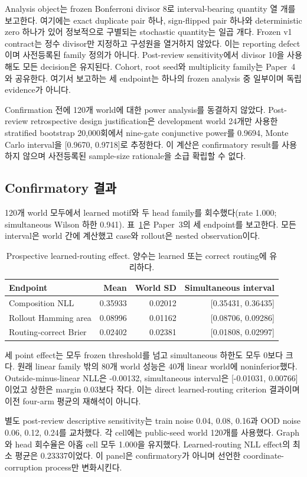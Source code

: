 Analysis object는 frozen Bonferroni divisor 8로 interval-bearing quantity 열 개를
보고한다. 여기에는 exact duplicate pair 하나, sign-flipped pair 하나와 deterministic
zero 하나가 있어 정보적으로 구별되는 stochastic quantity는 일곱 개다. Frozen v1
contract는 정수 divisor만 지정하고 구성원을 열거하지 않았다. 이는 reporting
defect이며 사전등록된 family 정의가 아니다. Post-review sensitivity에서 divisor 10을
사용해도 모든 decision은 유지된다. Cohort, root seed와 multiplicity family는
Paper~4와 공유한다. 여기서 보고하는 세 endpoint는 하나의 frozen analysis 중 일부이며
독립 evidence가 아니다.

Confirmation 전에 120개 world에 대한 power analysis를 동결하지 않았다. Post-review
retrospective design justification은 development world 24개만 사용한 stratified
bootstrap 20,000회에서 nine-gate conjunctive power를 0.9694, Monte Carlo interval을
[0.9670, 0.9718]로 추정한다. 이 계산은 confirmatory result를 사용하지 않으며
사전등록된 sample-size rationale을 소급 확립할 수 없다.

\subsection{Confirmatory 결과}

120개 world 모두에서 learned motif와 두 head family를 회수했다(rate 1.000;
simultaneous Wilson 하한 0.941). 표~\ref{tab:resolution}은 Paper~3의 세 endpoint를
보고한다. 모든 interval은 world 간에 계산했고 case와 rollout은 nested
observation이다.

\begin{table}[ht]
\centering
\caption{Prospective learned-routing effect. 양수는 learned 또는 correct routing에
유리하다.}
\label{tab:resolution}
\begin{tabular}{lrrr}
\toprule
Endpoint & Mean & World SD & Simultaneous interval \\
\midrule
Composition NLL & 0.35933 & 0.02012 & [0.35431, 0.36435] \\
Rollout Hamming area & 0.08996 & 0.01162 & [0.08706, 0.09286] \\
Routing-correct Brier & 0.02402 & 0.02381 & [0.01808, 0.02997] \\
\bottomrule
\end{tabular}
\end{table}

세 point effect는 모두 frozen threshold를 넘고 simultaneous 하한도 모두 0보다
크다. 원래 linear family 밖의 80개 world 성능은 40개 linear world에
noninferior했다. Outside-minus-linear NLL은 -0.00132, simultaneous interval은
[-0.01031, 0.00766]이었고 상한은 margin 0.03보다 작다. 이는 direct learned-routing
criterion 결과이며 이전 four-arm 평균의 재해석이 아니다.

별도 post-review descriptive sensitivity는 train noise 0.04, 0.08, 0.16과
OOD noise 0.06, 0.12, 0.24를 교차했다. 각 cell에는 public-seed world 120개를
사용했다. Graph와 head 회수율은 아홉 cell 모두 1.000을
유지했다. Learned-routing NLL effect의 최소 평균은 0.23337이었다. 이 panel은
confirmatory가 아니며 선언한 coordinate-corruption process만 변화시킨다.
